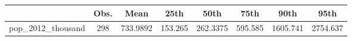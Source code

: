 {
\def\sym#1{\ifmmode^{#1}\else\(^{#1}\)\fi}
\begin{tabular}{l*{1}{ccccccc}}
\toprule
                    &        Obs.&        Mean&        25th&        50th&        75th&        90th&        95th\\
\midrule
pop\_2012\_thousand   &         298&    733.9892&     153.265&    262.3375&     595.585&    1605.741&    2754.637\\
\bottomrule
\end{tabular}
}
